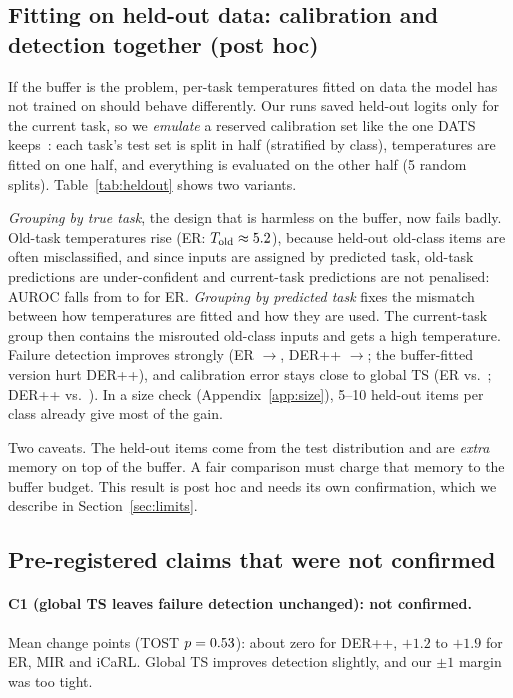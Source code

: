 \documentclass[11pt]{article}
\begin{document}


\subsection{Fitting on held-out data: calibration and detection together (post hoc)}\label{sec:heldout}
If the buffer is the problem, per-task temperatures fitted on data the model has not trained on
should behave differently. Our runs saved held-out logits only for the current task, so we
\emph{emulate} a reserved calibration set like the one DATS keeps~\cite{dats2025}: each task's test
set is split in half (stratified by class), temperatures are fitted on one half, and everything is
evaluated on the other half (5 random splits). Table~\ref{tab:heldout} shows two variants.

\emph{Grouping by true task}, the design that is harmless on the buffer, now fails badly.
Old-task temperatures rise (ER: $T_\mathrm{old}\approx5.2$), because held-out old-class items are
often misclassified, and since inputs are assigned by predicted task, old-task predictions are
under-confident and current-task predictions are not penalised: AUROC falls from \heldERmsp{} to
\heldERtrue{} for ER. \emph{Grouping by predicted task} fixes the mismatch between how
temperatures are fitted and how they are used. The current-task group then contains the misrouted
old-class inputs and gets a high temperature. Failure detection improves strongly (ER
\heldERmsp{}$\to$\heldERpred{}, DER++ \heldDmsp{}$\to$\heldDpred{}; the buffer-fitted version hurt
DER++), and calibration error stays close to global TS (ER \heldEReceTp{} vs.\ \heldEReceTs;
DER++ \heldDeceTp{} vs.\ \heldDeceTs). In a size check (Appendix~\ref{app:size}), 5--10 held-out
items per class already give most of the gain.

Two caveats. The held-out items come from the test distribution and are \emph{extra} memory on top
of the buffer. A fair comparison must charge that memory to the buffer budget. This result is post
hoc and needs its own confirmation, which we describe in Section~\ref{sec:limits}.



\subsection{Pre-registered claims that were not confirmed}\label{sec:null}
\paragraph{C1 (global TS leaves failure detection unchanged): not confirmed.} Mean change
\tsGainConfirm{} points (TOST $p=0.53$): about zero for DER++, $+1.2$ to $+1.9$ for ER, MIR and
iCaRL. Global TS improves detection slightly, and our $\pm1$ margin was too tight.
\end{document}
